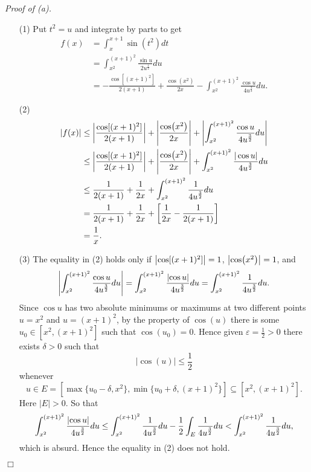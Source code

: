 \documentclass{article}
\begin{document}
\emph{Proof of (a).}
\begin{enumerate}
  \item[(1)]
  Put $t^2 = u$ and integrate by parts to get
  \begin{align*}
    f(x)
    &= \int_{x}^{x+1} \sin(t^2)dt \\
    &= \int_{x^2}^{(x+1)^2} \frac{\sin u}{2u^{\frac{1}{2}}} du \\
    &= - \frac{\cos[(x+1)^2]}{2(x+1)}
      + \frac{\cos(x^2)}{2x}
      - \int_{x^2}^{(x+1)^2} \frac{\cos u}{4u^{\frac{3}{2}}} du.
  \end{align*}

  \item[(2)]
  \begin{align*}
    |f(x)|
    &\leq \abs{ \frac{\cos[(x+1)^2]}{2(x+1)} }
      + \abs{ \frac{\cos(x^2)}{2x} }
      + \abs{ \int_{x^2}^{(x+1)^2} \frac{\cos u}{4u^{\frac{3}{2}}} du } \\
    &\leq \abs{ \frac{\cos[(x+1)^2]}{2(x+1)} }
      + \abs{ \frac{\cos(x^2)}{2x} }
      + \int_{x^2}^{(x+1)^2} \frac{|\cos u|}{4u^{\frac{3}{2}}} du \\
    &\leq \frac{1}{2(x+1)}
      + \frac{1}{2x}
      + \int_{x^2}^{(x+1)^2} \frac{1}{4u^{\frac{3}{2}}} du \\
    &= \frac{1}{2(x+1)}
      + \frac{1}{2x}
      + \left[ \frac{1}{2x} - \frac{1}{2(x+1)} \right] \\
    &= \frac{1}{x}.
  \end{align*}

  \item[(3)]
  The equality in (2) holds only if
  $\abs{ \cos[(x+1)^2] } = 1$, $\abs{ \cos(x^2) } = 1$,
  and
  \[
    \abs{ \int_{x^2}^{(x+1)^2} \frac{\cos u}{4u^{\frac{3}{2}}} du }
    = \int_{x^2}^{(x+1)^2} \frac{\abs{\cos u}}{4u^{\frac{3}{2}}} du
    = \int_{x^2}^{(x+1)^2} \frac{1}{4u^{\frac{3}{2}}} du.
  \]
  Since $\cos u$ has two absolute minimums or maximums at two different points
  $u = x^2$ and $u = (x+1)^2$, by the property of $\cos(u)$ there is some
  $u_0 \in [x^2,(x+1)^2]$ such that $\cos(u_0) = 0$.
  Hence given $\varepsilon = \frac{1}{2} > 0$ there exists $\delta > 0$
  such that
  \[
    |\cos(u)| \leq \frac{1}{2}
  \]
  whenever
  \[
    u \in E = [\max\{u_0-\delta,x^2\},\min\{u_0+\delta,(x+1)^2\}]
    \subseteq [x^2,(x+1)^2].
  \]
  Here $|E| > 0$.
  So that
  \[
    \int_{x^2}^{(x+1)^2} \frac{\abs{\cos u}}{4u^{\frac{3}{2}}} du
    \leq \int_{x^2}^{(x+1)^2} \frac{1}{4u^{\frac{3}{2}}} du
      - \frac{1}{2} \int_{E} \frac{1}{4u^{\frac{3}{2}}} du
    < \int_{x^2}^{(x+1)^2} \frac{1}{4u^{\frac{3}{2}}} du,
  \]
  which is absurd.
  Hence the equality in (2) does not hold.
\end{enumerate}
$\Box$ \\
\end{document}
